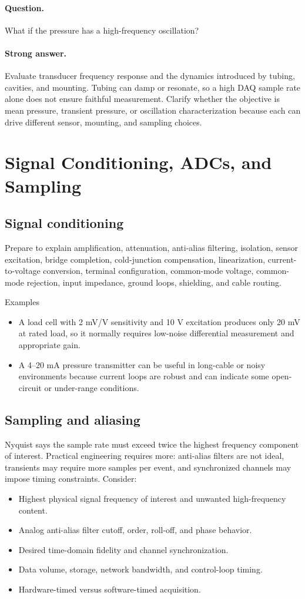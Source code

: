 \documentclass[11pt]{article}
\newcommand{\q}[1]{\paragraph{Question.} #1}
\newcommand{\ans}[1]{\paragraph{Strong answer.} #1}
\begin{document}
\q{What if the pressure has a high-frequency oscillation?}
\ans{Evaluate transducer frequency response and the dynamics introduced by tubing,
cavities, and mounting. Tubing can damp or resonate, so a high DAQ sample rate
alone does not ensure faithful measurement. Clarify whether the objective is mean
pressure, transient pressure, or oscillation characterization because each can
drive different sensor, mounting, and sampling choices.}

\section{Signal Conditioning, ADCs, and Sampling}

\subsection{Signal conditioning}
Prepare to explain amplification, attenuation, anti-alias filtering, isolation,
sensor excitation, bridge completion, cold-junction compensation, linearization,
current-to-voltage conversion, terminal configuration, common-mode voltage,
common-mode rejection, input impedance, ground loops, shielding, and cable
routing.

\begin{keybox}{Examples}
\begin{itemize}
  \item A load cell with 2 mV/V sensitivity and 10 V excitation produces only
  20 mV at rated load, so it normally requires low-noise differential measurement
  and appropriate gain.
  \item A 4--20 mA pressure transmitter can be useful in long-cable or noisy
  environments because current loops are robust and can indicate some open-circuit
  or under-range conditions.
\end{itemize}
\end{keybox}

\subsection{Sampling and aliasing}
Nyquist says the sample rate must exceed twice the highest frequency component
of interest. Practical engineering requires more: anti-alias filters are not
ideal, transients may require more samples per event, and synchronized channels
may impose timing constraints. Consider:
\begin{itemize}
  \item Highest physical signal frequency of interest and unwanted high-frequency content.
  \item Analog anti-alias filter cutoff, order, roll-off, and phase behavior.
  \item Desired time-domain fidelity and channel synchronization.
  \item Data volume, storage, network bandwidth, and control-loop timing.
  \item Hardware-timed versus software-timed acquisition.
\end{itemize}
\end{document}
